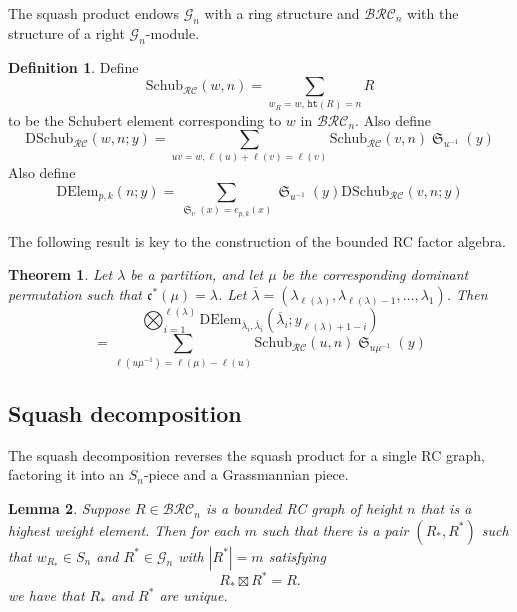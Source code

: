 \documentclass{amsart}
\newtheorem{lemma}{Lemma}[section]
\newtheorem{theorem}{Theorem}[section]
\theoremstyle{definition}
\newtheorem{definition}[lemma]{Definition}
\theoremstyle{remark}
\numberwithin{equation}{section}
\DeclareMathOperator{\sch}{\mathfrak{S}}
\newcommand{\BRC}{\mathcal{BRC}}
\newcommand{\RC}{\mathcal{RC}}
\newcommand{\grass}{\mathcal{G}}
\newcommand{\wof}[1]{w_{#1}}
\newcommand{\hr}{\mathtt{ht}}
\newcommand{\code}{\mathfrak{c}}
\begin{document}
The squash product endows $\grass_n$ with a ring structure and $\BRC_n$ with the structure of a right $\grass_n$-module.

\begin{definition}
Define 
$$\mathrm{Schub}_{\RC}(w, n) = \sum_{\wof{R} = w,\, \hr(R) = n} R$$ 
to be the Schubert element corresponding to $w$ in $\BRC_n$. Also define
$$\mathrm{DSchub}_{\RC}(w, n;y) = \sum_{uv = w, \ell(u) + \ell(v)=\ell(v)} \mathrm{Schub}_{\RC}(v, n)\sch_{u^{-1}}(y)$$ 
Also define
$$\mathrm{DElem}_{p,k}(n;y) = \sum_{\sch_v(x)=e_{p,k}(x)} \sch_{u^{-1}}(y)\mathrm{DSchub}_{\RC}(v, n; y)$$
\end{definition}

The following result is key to the construction of the bounded RC factor algebra.

\begin{theorem}
Let $\lambda$ be a partition, and let $\mu$ be the corresponding dominant permutation such that $\code^*(\mu)=\lambda$. Let $\overline{\lambda}=(\lambda_{\ell(\lambda)}, \lambda_{\ell(\lambda)-1},\ldots, \lambda_1)$. Then
$$\bigotimes_{i = 1}^{\ell(\lambda)}\mathrm{DElem}_{\overline{\lambda}_{i}, \overline{\lambda}_{i}}(\overline{\lambda}_{i};y_{\ell(\lambda) + 1 - i})$$
$$=\sum_{\ell(u\mu^{-1}) = \ell(\mu) - \ell(u)} \mathrm{Schub}_{\RC}(u, n)\sch_{u\mu^{-1}}(y)$$
\end{theorem}

\subsection{Squash decomposition}

The squash decomposition reverses the squash product for a single RC graph, factoring it into an $S_n$-piece and a Grassmannian piece.

\begin{lemma}
Suppose $R \in \BRC_n$ is a bounded RC graph of height $n$ that is a highest weight element. Then for each $m$ such that there is a pair $(R_\ast, R^\ast)$ such that $\wof{R_\ast} \in S_n$ and $R^\ast \in \grass_n$ with $|R^*|=m$ satisfying
\[
R_\ast \boxtimes R^\ast = R.
\]
we have that $R_\ast$ and $R^\ast$ are unique.
\end{lemma}
\end{document}
